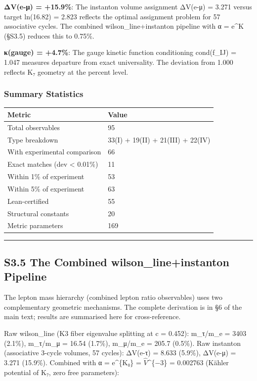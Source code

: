 \documentclass[11pt,a4paper]{article}
\begin{document}
{{{{\textbf{ΔV(e-μ) = +15.9\%}: The instanton volume assignment ΔV(e-μ) = 3.271 versus target ln(16.82) = 2.823 reflects the optimal assignment problem for 57 associative cycles. The combined wilson\_line+instanton pipeline with α = e\^{}K (§S3.5) reduces this to 0.75\%.

\textbf{κ(gauge) = +4.7\%}: The gauge kinetic function conditioning cond(f\_IJ) = 1.047 measures departure from exact universality. The deviation from 1.000 reflects K₇ geometry at the percent level.

\subsubsection{Summary Statistics}\label{summary-statistics}

{\def\LTcaptype{none} %
\begin{longtable}[]{@{}ll@{}}
\toprule\noalign{}
Metric & Value \\
\midrule\noalign{}
\endhead
\bottomrule\noalign{}
\endlastfoot
Total observables & 95 \\
Type breakdown & 33(I) + 19(II) + 21(III) + 22(IV) \\
With experimental comparison & 66 \\
Exact matches (dev \textless{} 0.01\%) & 11 \\
Within 1\% of experiment & 53 \\
Within 5\% of experiment & 63 \\
Lean-certified & 55 \\
Structural constants & 20 \\
Metric parameters & 169 \\
\end{longtable}
\begin{center}\rule{0.5\linewidth}{0.5pt}\end{center}

\subsection{S3.5 The Combined wilson\_line+instanton Pipeline}\label{s3.5-the-combined-wilson_lineinstanton-pipeline}

The lepton mass hierarchy (combined lepton ratio observables) uses two complementary geometric mechanisms. The complete derivation is in §6 of the main text; results are summarised here for cross-reference.

Raw wilson\_line (K3 fiber eigenvalue splitting at c = 0.452): m\_τ/m\_e = 3403 (2.1\%), m\_τ/m\_μ = 16.54 (1.7\%), m\_μ/m\_e = 205.7 (0.5\%). Raw instanton (associative 3-cycle volumes, 57 cycles): ΔV(e-τ) = 8.633 (5.9\%), ΔV(e-μ) = 3.271 (15.9\%). Combined with α = e\^{}\{K₀\} = $\hat{V}$\^{}\{−3\} = 0.002763 (Kähler potential of K₇, zero free parameters):

}}}}}
\end{document}

